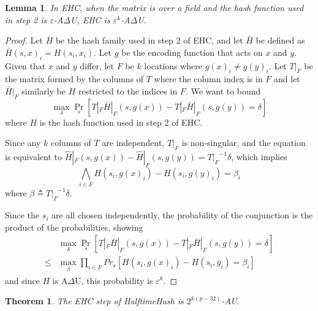 \documentclass[sigconf, nonacm]{acmart}
\newtheorem{theorem}{Theorem}
\newtheorem*{lemma}{Lemma}
\begin{document}
\begin{lemma}
  In EHC, when the matrix is over a field and the hash function used in step 2 is $\varepsilon$-A$\Delta$U, EHC is $\varepsilon^k$-A$\Delta$U.
\end{lemma}
\begin{proof}
  Let $H$ be the hash family used in step 2 of EHC, and let $\bar{H}$ be defined as $\bar{H}(s, x)_i = H(s_i, x_i)$.
  Let $g$ be the encoding function that acts on $x$ and $y$.
  Given that $x$ and $y$ differ, let $F$ be $k$ locations where $g(x)_i \neq g(y)_i$.
  Let $T|_F$ be the matrix formed by the columns of $T$ where the column index is in $F$ and let $\bar{H}|_F$ similarly be $H$ restricted to the indices in $F$.
  We want to bound
  \begin{equation}
    \label{ehc-delta}
    \max_\delta \Pr_s[T|_F \bar{H}|_F(s, g(x)) - T|_F \bar{H}|_F(s, g(y)) = \delta]
  \end{equation}
  where $H$ is the hash function used in step 2 of EHC.

  Since any $k$ columns of $T$ are independent, $T|_F$ is non-singular, and the equation is equivalent to $\hat{H}|_F(s, g(x)) - \hat{H}|_F(s, g(y)) = {T|_F}^{-1} \delta$, which implies
  \[
  \bigwedge_{i \in F} H(s_i, g(x)_i) - H(s_i, g(y)_i) = \beta_i
  \]
  where $\beta \triangleq {T|_F}^{-1} \delta$.

  Since the $s_i$ are all chosen independently, the probability of the conjunction is the product of the probabilities, showing
  \[
  \begin{array}{rl}
    & \max_\delta \Pr_s[T|_F \bar{H}|_F (s,g(x)) - T|_F \bar{H}|_F(s,g(y)) = \delta] \\
  \leq & \max_\beta \prod_{i \in F} Pr_s[H(s_i, g(x)_i) - H(s_i, \bar{y}_i) = \beta_i]
  \end{array}
  \]
  and since $H$ is A$\Delta$U, this probability is $\varepsilon^k$.
\end{proof}

\begin{theorem}
  The EHC step of HalftimeHash is $2^{k(p-32)}$-AU.
\end{theorem}
\end{document}
